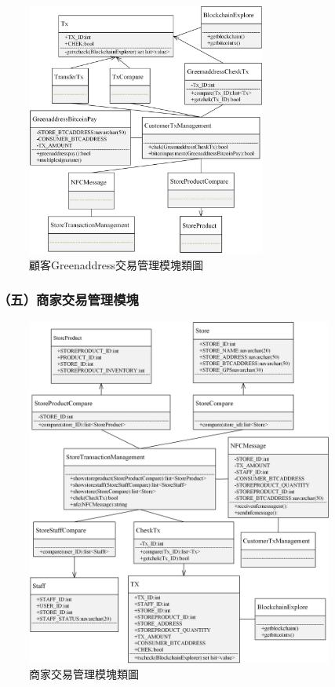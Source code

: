	\begin{figure}[htbp]
		\centering
		\includegraphics[width = 0.7\textwidth]{c6.jpg}
		\caption{顧客Greenaddress交易管理模塊類圖}\label{c6}
	\end{figure}



	


\subsubsection{（五）商家交易管理模塊}

	\begin{figure}[htbp]
		\centering
		\includegraphics[width = 0.9\textwidth]{c5.jpg}
		\caption{商家交易管理模塊類圖}\label{c5}
	\end{figure}



